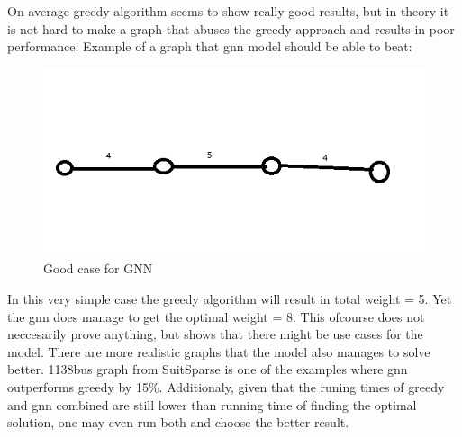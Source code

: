 On average greedy algorithm seems to show really good results, but in theory it is not hard to make a graph that abuses the greedy approach and results in poor performance. Example of a graph that \gls{gnn} model should be able to beat:

\begin{figure}[H]
    \centering
    \includegraphics[scale=1.0]{figures/GoodCase}
    \caption{Good case for GNN}
    \label{Good case for GNN}
\end{figure}

In this very simple case the greedy algorithm will result in total weight = 5. Yet the \gls{gnn} does manage to get the optimal weight = 8. This ofcourse does not neccesarily prove anything, but shows that there might be use cases for the model. There are more realistic graphs that the model also manages to solve better. 1138bus graph from SuitSparse is one of the examples where \gls{gnn} outperforms greedy by 15\%. Additionaly, given that the runing times of greedy and \gls{gnn} combined are still lower than running time of finding the optimal solution, one may even run both and choose the better result.

